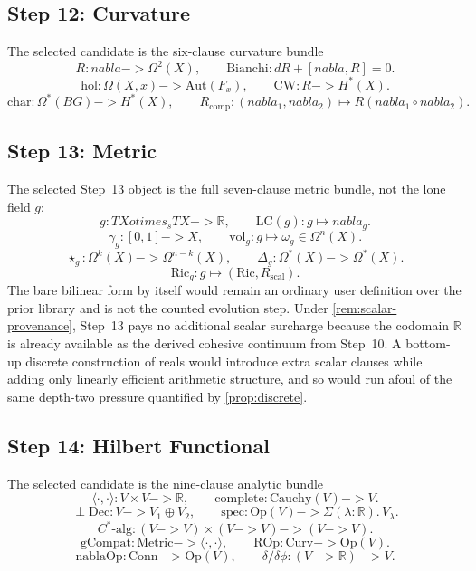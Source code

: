\documentclass[11pt,a4paper]{article}
\def\to{->}%
\def\otimes{otimes}%
\def\nabla{nabla}%
\theoremstyle{plain}
\theoremstyle{definition}
\theoremstyle{remark}
\newcommand{\R}{\mathbb{R}}
\begin{document}
\subsection{Step 12: Curvature}

The selected candidate is the six-clause curvature bundle
\[
  R:\nabla\to \Omega^2(X),
  \qquad
  \mathrm{Bianchi}:dR+[\nabla,R]=0.
\]
\[
  \mathrm{hol}:\Omega(X,x)\to \mathrm{Aut}(F_x),
  \qquad
  \mathrm{CW}:R\to H^*(X).
\]
\[
  \mathrm{char}:\Omega^*(BG)\to H^*(X),
  \qquad
  R_{\mathrm{comp}}:(\nabla_1,\nabla_2)\mapsto R(\nabla_1\circ\nabla_2).
\]

\subsection{Step 13: Metric}

The selected Step~13 object is the full seven-clause metric bundle, not the lone field $g$:
\[
  g:TX\otimes_s TX\to \R,
  \qquad
  \mathrm{LC}(g):g\mapsto \nabla_g.
\]
\[
  \gamma_g:[0,1]\to X,
  \qquad
  \mathrm{vol}_g:g\mapsto \omega_g\in\Omega^n(X).
\]
\[
  \star_g:\Omega^k(X)\to \Omega^{n-k}(X),
  \qquad
  \Delta_g:\Omega^*(X)\to \Omega^*(X).
\]
\[
  \mathrm{Ric}_g:g\mapsto (\mathrm{Ric},R_{\mathrm{scal}}).
\]
The bare bilinear form by itself would remain an ordinary user definition over the prior library and is not the counted evolution step.  Under \cref{rem:scalar-provenance}, Step~13 pays no additional scalar surcharge because the codomain $\R$ is already available as the derived cohesive continuum from Step~10.  A bottom-up discrete construction of reals would introduce extra scalar clauses while adding only linearly efficient arithmetic structure, and so would run afoul of the same depth-two pressure quantified by \cref{prop:discrete}.

\subsection{Step 14: Hilbert Functional}

The selected candidate is the nine-clause analytic bundle
\[
  \langle\cdot,\cdot\rangle:V\times V\to \R,
  \qquad
  \mathrm{complete}:\mathrm{Cauchy}(V)\to V.
\]
\[
  \perp\mathrm{Dec}:V\to V_1\oplus V_2,
  \qquad
  \mathrm{spec}:\mathrm{Op}(V)\to \Sigma(\lambda:\R).\,V_\lambda.
\]
\[
  C^*\text{-alg}:(V\to V)\times (V\to V)\to (V\to V).
\]
\[
  \mathrm{gCompat}:\mathrm{Metric}\to \langle\cdot,\cdot\rangle,
  \qquad
  \mathrm{ROp}:\mathrm{Curv}\to \mathrm{Op}(V).
\]
\[
  \mathrm{nablaOp}:\mathrm{Conn}\to \mathrm{Op}(V),
  \qquad
  \delta/\delta\phi:(V\to \R)\to V.
\]
\end{document}
